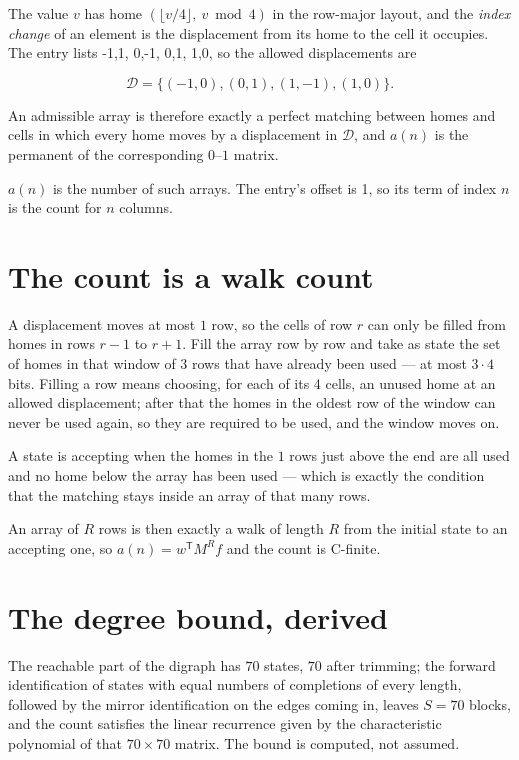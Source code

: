\documentclass[11pt]{article}
\theoremstyle{definition}
\begin{document}
The value $v$ has home $(\lfloor v/4\rfloor,\ v \bmod 4)$ in the row-major layout, and the {\itshape index change} of an element is the displacement from its home to the cell it occupies. The entry lists -1,1, 0,-1, 0,1, 1,0, so the allowed displacements are

\[\mathcal{D} = \{(-1,0), (0,1), (1,-1), (1,0)\}.\]

An admissible array is therefore exactly a perfect matching between homes and cells in which every home moves by a displacement in $\mathcal{D}$, and $a(n)$ is the permanent of the corresponding $0$--$1$ matrix.

$a(n)$ is the number of such arrays. The entry's offset is 1, so its term of index $n$ is the count for $n$ columns.

\section{The count is a walk count}

A displacement moves at most $1$ row, so the cells of row $r$ can only be filled from homes in rows $r-1$ to $r+1$. Fill the array row by row and take as state the set of homes in that window of $3$ rows that have already been used --- at most $3\cdot4$ bits. Filling a row means choosing, for each of its $4$ cells, an unused home at an allowed displacement; after that the homes in the oldest row of the window can never be used again, so they are required to be used, and the window moves on.

A state is accepting when the homes in the $1$ rows just above the end are all used and no home below the array has been used --- which is exactly the condition that the matching stays inside an array of that many rows.

An array of $R$ rows is then exactly a walk of length $R$ from the initial state to an accepting one, so $a(n) = w^{\mathsf T}M^{R}f$ and the count is C-finite.

\section{The degree bound, derived}

The reachable part of the digraph has $70$ states, $70$ after trimming; the forward identification of states with equal numbers of completions of every length, followed by the mirror identification on the edges coming in, leaves $S = 70$ blocks, and the count satisfies the linear recurrence given by the characteristic polynomial of that $70\times70$ matrix. The bound is computed, not assumed.
\end{document}
